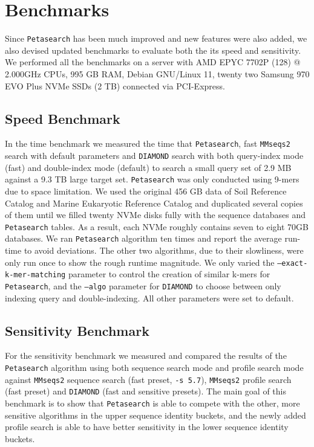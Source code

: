 \section{Benchmarks} \label{section:benchmarks}

Since \texttt{Petasearch} has been much improved and new features were also added, we also devised updated benchmarks to evaluate both the its speed and sensitivity.
We performed all the benchmarks on a server with AMD EPYC 7702P (128) @ 2.000GHz CPUs, 995 GB RAM, Debian GNU/Linux 11, twenty two Samsung 970 EVO Plus NVMe SSDs (2 TB) connected via PCI-Express.

\subsection{Speed Benchmark} \label{section:speed-benchmark}

In the time benchmark we measured the time that \texttt{Petasearch}, fast \texttt{MMseqs2} search with default parameters and \texttt{DIAMOND} search with both query-index mode (fast) and double-index mode (default) to search a small query set of 2.9 MB against a 9.3 TB large target set.
\texttt{Petasearch} was only conducted using 9-mers due to space limitation.
We used the original 456 GB data of Soil Reference Catalog and Marine Eukaryotic Reference Catalog and duplicated several copies of them until we filled twenty NVMe disks fully with the sequence databases and \texttt{Petasearch} tables.
As a result, each NVMe roughly contains seven to eight 70GB databases.
We ran \texttt{Petasearch} algorithm ten times and
report the average run-time to avoid deviations.
The other two algorithms, due to their slowliness, were only run once to show the rough runtime magnitude.
We only varied the \texttt{--exact-k-mer-matching} parameter to control the creation of similar k-mers for \texttt{Petasearch}, and the \texttt{--algo} parameter for \texttt{DIAMOND} to choose between only indexing query and double-indexing.
All other parameters were set to default.

\subsection{Sensitivity Benchmark} \label{section:sensitivity-benchmark}

For the sensitivity benchmark we measured and compared the results of the \texttt{Petasearch} algorithm using both sequence search mode and profile search mode against \texttt{MMseqs2} sequence search (fast preset, \texttt{-s 5.7}), \texttt{MMseqs2} profile search (fast preset) and \texttt{DIAMOND} (fast and sensitive presets).
The main goal of this benchmark is to show that \texttt{Petasearch} is able to compete with the other, more sensitive algorithms in the upper sequence identity buckets, and the newly added profile search is able to have better sensitivity in the lower sequence identity buckets.

